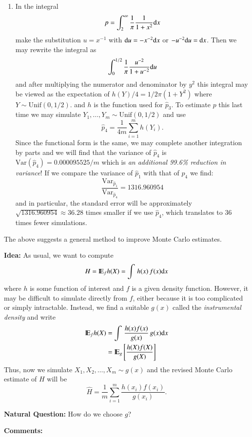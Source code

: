 \documentclass[11pt,english]{scrbook}
\begin{document}
\begin{enumerate}
\item In the integral 
\[
  p=\int_{2}^{\infty}\frac{1}{\pi}\frac{1}{1+x^{2}}\mathrm{d} x
  \]
make the substitution \(u=x^{-1}\) with \(\mathrm{d} u=-x^{-2}\mathrm{d} x\) or \(-u^{-2}\mathrm{d} u=\mathrm{d} x\).
Then we may rewrite the integral as 
\[
  \int_{0}^{1/2}\frac{1}{\pi}\frac{u^{-2}}{1+u^{-2}}\mathrm{d} u
  \]
and after multiplying the numerator and denominator by \(y^{2}\) this integral may be viewed as the expectation of \(h(Y)/4=1/2\pi(1+Y^{2})\) where \(Y\sim\mathrm{Unif}(0,1/2)\). and \(h\) is the function used for \(\hat{p}_{3}\). To estimate \(p\) this last time we may simulate \(Y_{1},\ldots,Y_{m}\sim\mathrm{Unif}(0,1/2)\) and use
\[
  \hat{p}_{4} = \frac{1}{4m}\sum_{i=1}^{m} h(Y_{i}).
  \]
Since the functional form is the same, we may complete another integration by parts and we will find that the variance of \(\hat{p}_{4}\) is \(\mbox{Var}(\hat{p}_{4})=0.000095525/m\) which is \emph{an additional 99.6\% reduction in variance}! If we compare the variance of \(\hat{p}_{1}\) with that of \(\hat{p}_{4}\) we find: 
\[
  \frac{\mathrm{Var}_{\hat{p}_{1}}}{\mathrm{Var}_{\hat{p}_{4}}}=1316.960954
  \]
and in particular, the standard error will be approximately \(\sqrt{1316.960954}\approx 36.28\) times smaller if we use \(\hat{p}_{4}\), which translates to 36 times fewer simulations.
\end{enumerate}


The above suggests a general method to improve Monte Carlo estimates.

\textbf{Idea:} As usual, we want to compute 
\[
H = \mathrm{I\hspace{-1.5pt}E}_{f}h(X) = \int\, h(x)\, f(x)\mathrm{d} x
\]
where \(h\) is some function of interest and \(f\) is a given density function. However, it may be difficult to simulate directly from \(f\), either because it is too complicated or simply intractable. Instead, we find a suitable \(g(x)\) called the \emph{instrumental density} and write 
\begin{align*}
\mathrm{I\hspace{-1.5pt}E}_{f}h(X) & =\int\,\frac{h(x)f(x)}{g(x)}\, g(x)\mathrm{d} x\\
 & =\mathrm{I\hspace{-1.5pt}E}_{g}\left[\frac{h(X)f(X)}{g(X)}\right]
\end{align*}
Thus, now we simulate \(X_{1},X_{2},\ldots,X_{m}\sim g(x)\) and the revised Monte Carlo estimate of \(H\) will be 
\[
\hat{H} = \frac{1}{m}\sum_{i=1}^{m}\frac{h(x_{i})f(x_{i})}{g(x_{i})}.
\]


\textbf{Natural Question:} How do we choose \(g\)?

\textbf{Comments:}
\end{document}
